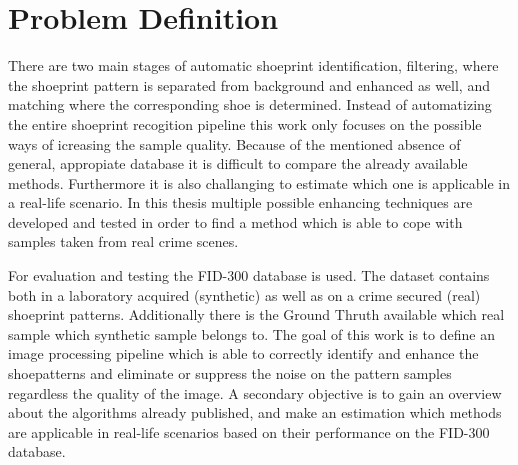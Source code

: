 \documentclass[draft,final]{vutinfth} %
\begin{document}
\section{Problem Definition}
\par
There are two main stages of automatic shoeprint identification, filtering, where the shoeprint pattern is separated from background and enhanced as well, and matching where the corresponding shoe is determined.
Instead of automatizing the entire shoeprint recogition pipeline this work only focuses on the possible ways of icreasing the sample quality.
Because of the mentioned absence of general, appropiate database it is difficult to compare the already available methods.
Furthermore it is also challanging to estimate which one is applicable in a real-life scenario.
In this thesis multiple possible enhancing techniques are developed and tested in order to find a method which is able to cope with samples taken from real crime scenes.
\par
For evaluation and testing the FID-300 database is used.
The dataset contains both in a laboratory acquired (synthetic) as well as on a crime secured (real) shoeprint patterns.
Additionally there is the Ground Thruth available which real sample which synthetic sample belongs to.
The goal of this work is to define an image processing pipeline which is able to correctly identify and enhance the shoepatterns and eliminate or suppress the noise on the pattern samples regardless the quality of the image.
A secondary objective is to gain an overview about the algorithms already published, and make an estimation which methods are applicable in real-life scenarios based on their performance on the FID-300 database.
\end{document}
